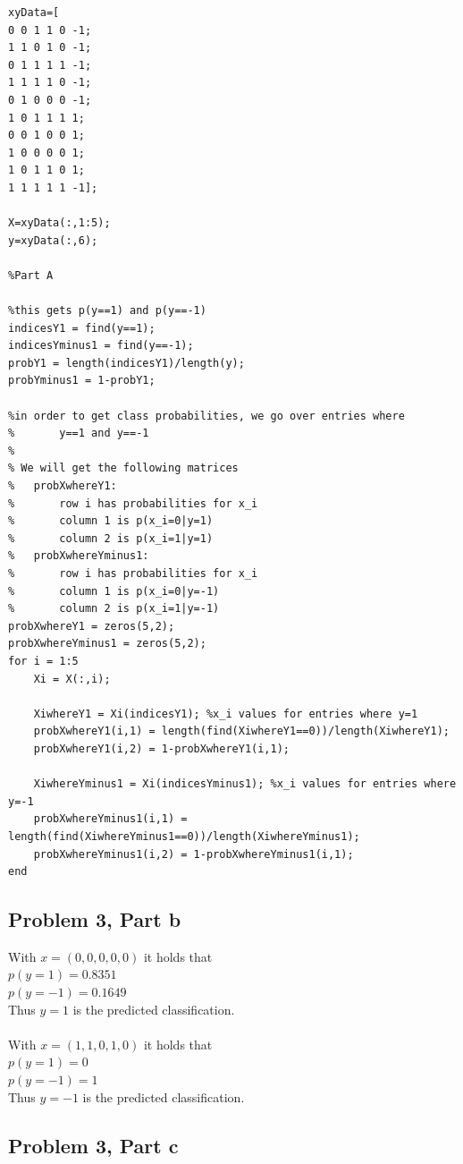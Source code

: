 \documentclass[11pt,psfig]{article}
\begin{document}
\begin{verbatim}
xyData=[
0 0 1 1 0 -1;
1 1 0 1 0 -1;
0 1 1 1 1 -1;
1 1 1 1 0 -1;
0 1 0 0 0 -1;
1 0 1 1 1 1;
0 0 1 0 0 1;
1 0 0 0 0 1;
1 0 1 1 0 1;
1 1 1 1 1 -1];   

X=xyData(:,1:5);
y=xyData(:,6);

%Part A

%this gets p(y==1) and p(y==-1)
indicesY1 = find(y==1);
indicesYminus1 = find(y==-1);
probY1 = length(indicesY1)/length(y);
probYminus1 = 1-probY1;

%in order to get class probabilities, we go over entries where
%       y==1 and y==-1
%
% We will get the following matrices
%   probXwhereY1:
%       row i has probabilities for x_i
%       column 1 is p(x_i=0|y=1)
%       column 2 is p(x_i=1|y=1)
%   probXwhereYminus1:
%       row i has probabilities for x_i
%       column 1 is p(x_i=0|y=-1)
%       column 2 is p(x_i=1|y=-1)
probXwhereY1 = zeros(5,2);
probXwhereYminus1 = zeros(5,2);
for i = 1:5
    Xi = X(:,i);
    
    XiwhereY1 = Xi(indicesY1); %x_i values for entries where y=1
    probXwhereY1(i,1) = length(find(XiwhereY1==0))/length(XiwhereY1);
    probXwhereY1(i,2) = 1-probXwhereY1(i,1);
    
    XiwhereYminus1 = Xi(indicesYminus1); %x_i values for entries where y=-1
    probXwhereYminus1(i,1) = length(find(XiwhereYminus1==0))/length(XiwhereYminus1);
    probXwhereYminus1(i,2) = 1-probXwhereYminus1(i,1);
end
\end{verbatim}

\subsection*{Problem 3, Part b}

With $x=(0,0,0,0,0)$ it holds that \\
$p(y=1)=0.8351$\\
$p(y=-1)=0.1649$\\
Thus $y=1$ is the predicted classification.\\
\\
With $x=(1,1,0,1,0)$ it holds that \\
$p(y=1)=0$ \\
$p(y=-1)=1$ \\
Thus $y=-1$ is the predicted classification.\\

\subsection*{Problem 3, Part c}
\end{document}
